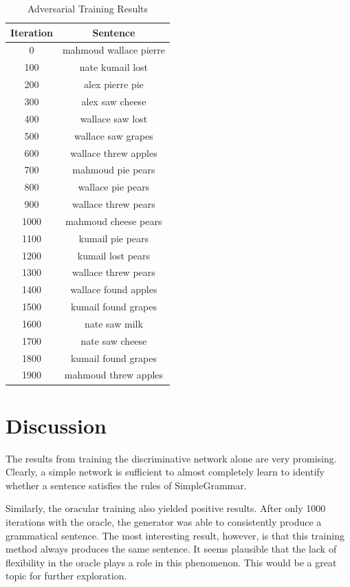 \documentclass[11pt]{article}
\begin{document}
\begin{table}[ht]
    \centering
    \begin{tabular}{c|c}
        Iteration & Sentence \\
        \hline
        0 & mahmoud wallace pierre \\
        100 & nate kumail lost \\
        200 & alex pierre pie \\
        300 & alex saw cheese \\
        400 & wallace saw lost \\
        500 & wallace saw grapes \\
        600 & wallace threw apples \\
        700 & mahmoud pie pears \\
        800 & wallace pie pears \\
        900 & wallace threw pears \\
        1000 & mahmoud cheese pears \\
        1100 & kumail pie pears \\
        1200 & kumail lost pears \\
        1300 & wallace threw pears \\
        1400 & wallace found apples \\
        1500 & kumail found grapes \\
        1600 & nate saw milk \\
        1700 & nate saw cheese \\
        1800 & kumail found grapes \\
        1900 & mahmoud threw apples \\
    \end{tabular}
    \caption{Adversarial Training Results}
    \label{tab:adversarial_results}
\end{table}


\section{Discussion}

The results from training the discriminative network alone are very promising. Clearly, a simple network is sufficient to almost completely learn to identify whether a sentence satisfies the rules of SimpleGrammar.

Similarly, the oracular training also yielded positive results. After only 1000 iterations with the oracle, the generator was able to consistently produce a grammatical sentence. The most interesting result, however, is that this training method always produces the same sentence. It seems plausible that the lack of flexibility in the oracle plays a role in this phenomenon. This would be a great topic for further exploration.
\end{document}
